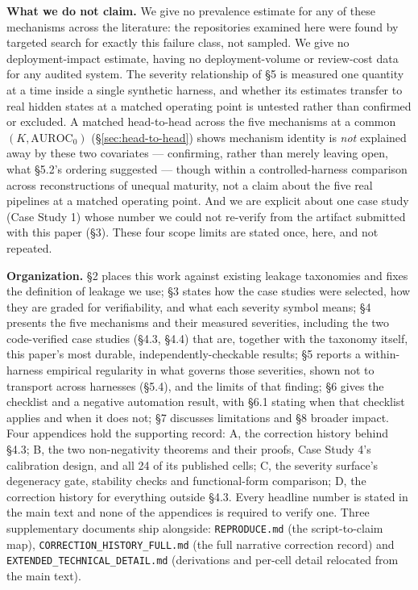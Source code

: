 \documentclass[10pt]{article} %
\begin{document}
\textbf{What we do not claim.} We give no prevalence estimate for any of these
mechanisms across the literature: the repositories examined here were found by
targeted search for exactly this failure class, not sampled. We give no
deployment-impact estimate, having no deployment-volume or review-cost data for
any audited system. The severity relationship of §5 is measured one quantity at
a time inside a single synthetic harness, and whether its estimates transfer to
real hidden states at a matched operating point is untested rather than
confirmed or excluded. A matched head-to-head across the five mechanisms at a
common $(K,\text{AUROC}_0)$ (\S\ref{sec:head-to-head}) shows mechanism
identity is \emph{not} explained away by these two covariates ---
confirming, rather than merely leaving open, what §5.2's ordering suggested
--- though within a controlled-harness comparison across reconstructions of
unequal maturity, not a claim about the five real pipelines at a matched
operating point. And we are explicit about one case study (Case Study 1)
whose number we could not re-verify from the artifact submitted with this paper
(§3). These four scope limits are stated once, here, and not repeated.

\textbf{Organization.} §2 places this work against existing leakage taxonomies
and fixes the definition of leakage we use; §3 states how the case studies were
selected, how they are graded for verifiability, and what each severity symbol
means; §4 presents the five mechanisms and their measured severities, including
the two code-verified case studies (§4.3, §4.4) that are, together with the
taxonomy itself, this paper's most durable, independently-checkable results;
§5 reports a within-harness empirical regularity in what governs those
severities, shown not to transport across harnesses (§5.4), and the limits of
that finding; §6 gives the checklist and a negative automation result, with
§6.1 stating when that checklist applies and when it does not; §7 discusses
limitations and §8 broader impact. Four appendices hold the supporting record:
A, the correction history behind §4.3; B, the two non-negativity theorems and
their proofs, Case Study 4's calibration design, and all 24 of its published
cells; C, the severity surface's degeneracy gate, stability checks and
functional-form comparison; D, the correction history for everything outside
§4.3. Every headline number is stated in the main text and none of the
appendices is required to verify one. Three supplementary documents ship
alongside: \texttt{REPRODUCE.md} (the script-to-claim map),
\texttt{CORRECTION\_HISTORY\_FULL.md} (the full narrative correction record)
and \texttt{EXTENDED\_TECHNICAL\_DETAIL.md} (derivations and per-cell detail
relocated from the main text).
\end{document}

